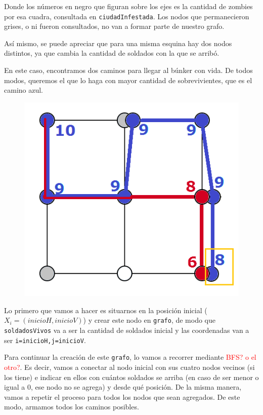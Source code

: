 Donde los n\'umeros en negro que figuran sobre los ejes es la cantidad de zombies por esa cuadra, consultada en \texttt{ciudadInfestada}. 
Los nodos que permanecieron grises, o ni fueron consultados, no van a formar parte de nuestro grafo.

As\'i mismo, se puede apreciar que para una misma esquina hay dos nodos distintos, ya que cambia la cantidad de soldados con la que se arrib\'o.\\

\newpage

En este caso, encontramos dos caminos para llegar al b\'unker con vida. De todos modos, queremos el que lo haga con mayor cantidad de sobrevivientes, que es el camino azul.

   \begin{figure}[h!]
   \begin{center}
 	\includegraphics[scale=0.7]{imagenes/ej2/final.png}
   \end{center}
 \end{figure}

\bigskip

Lo primero que vamos a hacer es situarnos en la posici\'on inicial ($X_i = (inicioH, inicioV)$) y crear este nodo en \texttt{grafo}, de modo que \texttt{soldadosVivos} va a ser la cantidad de soldados inicial y las coordenadas van a ser \texttt{i=inicioH,j=inicioV}. 

Para continuar la creaci\'on de este \texttt{grafo}, lo vamos a recorrer mediante \textcolor{red}{BFS? o el otro?}. Es decir, vamos a conectar al nodo inicial con sus cuatro nodos vecinos (si los tiene) e indicar en ellos con cu\'antos soldados se arriba (en caso de ser menor o igual a 0, ese nodo no se agrega) y desde qu\'e posici\'on. De la misma manera, vamos a repetir el proceso para todos los nodos que sean agregados. De este modo, armamos todos los caminos posibles.

